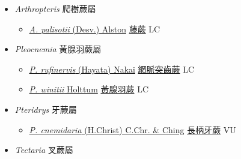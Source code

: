 
  \begin{itemize}
 \item[] \textit{Arthropteris} 爬樹蕨屬
                    
  \begin{itemize}
        \item[] \href{http://www.theplantlist.org/tpl1.1/search?q=Arthropteris+palisotii}{\textit{A. palisotii} (Desv.) Alston}   \href{\detokenize{http://taibnet.sinica.edu.tw/chi/taibnet_species_list.php?T2=藤蕨&T2_new_value=true&fr=y}}{藤蕨} LC
  \end{itemize}
 \item[] \textit{Pleocnemia} 黃腺羽蕨屬
                    
  \begin{itemize}
        \item[] \href{http://www.theplantlist.org/tpl1.1/search?q=Pleocnemia+rufinervis}{\textit{P. rufinervis} (Hayata) Nakai}   \href{\detokenize{http://taibnet.sinica.edu.tw/chi/taibnet_species_list.php?T2=網脈突齒蕨&T2_new_value=true&fr=y}}{網脈突齒蕨} LC
        \item[] \href{http://www.theplantlist.org/tpl1.1/search?q=Pleocnemia+winitii}{\textit{P. winitii} Holttum}     \href{\detokenize{http://taibnet.sinica.edu.tw/chi/taibnet_species_list.php?T2=黃腺羽蕨&T2_new_value=true&fr=y}}{黃腺羽蕨} LC
  \end{itemize}
 \item[] \textit{Pteridrys} 牙蕨屬
                    
  \begin{itemize}
        \item[] \href{http://www.theplantlist.org/tpl1.1/search?q=Pteridrys+cnemidaria}{\textit{P. cnemidaria} (H.Christ) C.Chr. \& Ching}   \href{\detokenize{http://taibnet.sinica.edu.tw/chi/taibnet_species_list.php?T2=長柄牙蕨&T2_new_value=true&fr=y}}{長柄牙蕨} VU
  \end{itemize}
 \item[] \textit{Tectaria} 叉蕨屬
                    

\end{itemize}
